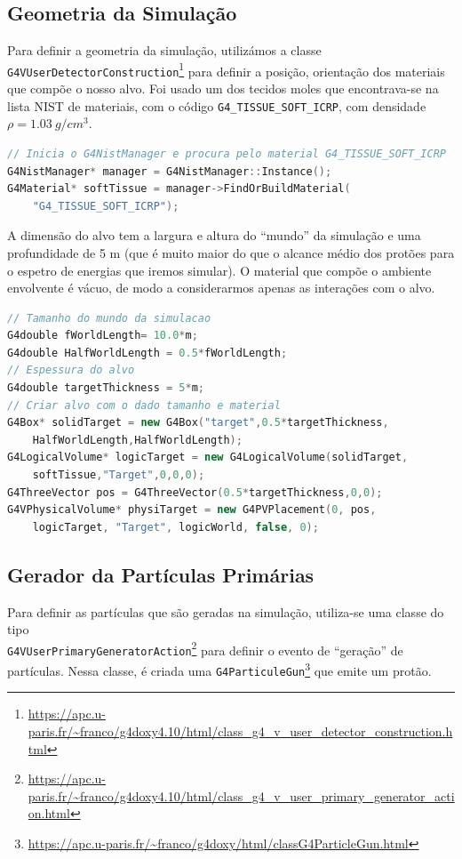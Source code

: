 \documentclass[a4paper, 12pt]{article} %
\begin{document}
	\subsection{Geometria da Simulação}
	Para definir a geometria da simulação, utilizámos a classe \texttt{G4VUserDetectorConstruction}\footnote{\url{https://apc.u-paris.fr/~franco/g4doxy4.10/html/class_g4_v_user_detector_construction.html}} para definir a posição, orientação dos materiais que compõe o nosso alvo. Foi usado um dos tecidos moles que encontrava-se na lista NIST de materiais, com o código \texttt{G4\_TISSUE\_SOFT\_ICRP}, com densidade $\rho=1.03\ g/cm^3$.

	\begin{lstlisting}[language=C++]
// Inicia o G4NistManager e procura pelo material G4_TISSUE_SOFT_ICRP
G4NistManager* manager = G4NistManager::Instance();
G4Material* softTissue = manager->FindOrBuildMaterial(
	"G4_TISSUE_SOFT_ICRP");
	\end{lstlisting}

	A dimensão do alvo tem a largura e altura do ``mundo'' da simulação e uma profundidade de 5 m (que é muito maior do que o alcance médio dos protões para o espetro de energias que iremos simular). O material que compõe o ambiente envolvente é vácuo, de modo a considerarmos apenas as interações com o alvo.  

	\begin{lstlisting}[language=C++]
// Tamanho do mundo da simulacao
G4double fWorldLength= 10.0*m;
G4double HalfWorldLength = 0.5*fWorldLength;
// Espessura do alvo
G4double targetThickness = 5*m;
// Criar alvo com o dado tamanho e material
G4Box* solidTarget = new G4Box("target",0.5*targetThickness,
	HalfWorldLength,HalfWorldLength);
G4LogicalVolume* logicTarget = new G4LogicalVolume(solidTarget,
	softTissue,"Target",0,0,0);
G4ThreeVector pos = G4ThreeVector(0.5*targetThickness,0,0);
G4VPhysicalVolume* physiTarget = new G4PVPlacement(0, pos, 
	logicTarget, "Target", logicWorld, false, 0);	
	\end{lstlisting}

\subsection{Gerador da Partículas Primárias}
	Para definir as partículas que são geradas na simulação, utiliza-se uma classe do tipo \\\texttt{G4VUserPrimaryGeneratorAction}\footnote{\url{https://apc.u-paris.fr/~franco/g4doxy4.10/html/class_g4_v_user_primary_generator_action.html}} para definir o evento de ``geração'' de partículas. Nessa classe, é criada uma \texttt{G4ParticuleGun}\footnote{\url{https://apc.u-paris.fr/~franco/g4doxy/html/classG4ParticleGun.html}} que emite um protão.
\end{document}
